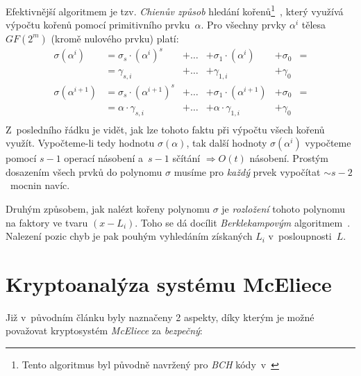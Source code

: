 \documentclass[thesis=M,czech,hidelinks]{FITthesis}[2012/06/26]
\newcommand{\0}{{\textcolor[gray]{0.75}{0}}}
\begin{document}
Efektivnější algoritmem je tzv. \emph{Chienův způsob} hledání kořenů\footnote{
    Tento algoritmus byl původně navržený pro \emph{BCH} kódy~v~\cite{Chien}
}~\cite{FIT_AAK,Heyse}, který využívá výpočtu kořenů pomocí primitivního
prvku~$\alpha$. Pro všechny prvky $\alpha^i$ tělesa $GF(2^m)$ (kromě nulového
prvku) platí:
\begin{align*}
    \sigma\left(\alpha^i\right)     &= \sigma_s \cdot \left(\alpha^i\right)^s     &+ \ldots &+ \sigma_1 \cdot \left(\alpha^i\right)     &+ \sigma_0 &= \\
                                    &= \gamma_{s,i}                               &+ \ldots &+ \gamma_{1,i}                             &+ \gamma_0 &  \\
    \sigma\left(\alpha^{i+1}\right) &= \sigma_s \cdot \left(\alpha^{i+1}\right)^s &+ \ldots &+ \sigma_1 \cdot \left(\alpha^{i+1}\right) &+ \sigma_0 &= \\
                                    &= \alpha \cdot \gamma_{s,i}                  &+ \ldots &+ \alpha \cdot \gamma_{1,i}                &+ \gamma_0 &  \\
\end{align*}
Z~posledního řádku je vidět, jak lze tohoto faktu při výpočtu všech kořenů
využít. Vypočteme-li tedy hodnotu $\sigma(\alpha)$, tak další hodnoty
$\sigma\left(\alpha^i\right)$ vypočteme pomocí $s-1$ operací násobení a~$s-1$
sčítání $\Rightarrow O(t)$ násobení. Prostým dosazením všech prvků do polynomu
$\sigma$ musíme pro \emph{každý} prvek vypočítat $\sim s-2$~mocnin navíc.

Druhým způsobem, jak nalézt kořeny polynomu $\sigma$ je \emph{rozložení} tohoto
polynomu na faktory ve tvaru $(x-L_i)$. Toho se dá docílit \emph{Berklekampovým}
algoritmem~\cite{Berlekamp3}. Nalezení pozic chyb je pak pouhým vyhledáním
získaných $L_i$ v~posloupnosti~$L$.





\chapter{Kryptoanalýza systému McEliece}\label{kap_kryptoanalyza}

Již v~původním článku \cite{McEliece} byly naznačeny 2 aspekty, díky kterým je
možné považovat kryptosystém \emph{McEliece} za \emph{bezpečný}:
\end{document}
